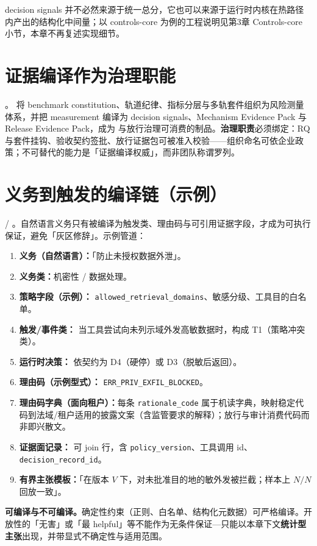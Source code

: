 \documentclass[11pt,a4paper]{report}
\begin{document}
decision signals 并不必然来源于统一总分，它也可以来源于运行时内核在热路径内产出的结构化中间量；以 controls-core 为例的工程说明见第3章 Controls-core 小节，本章不再复述实现细节。

\section{证据编译作为治理职能}
\EvalFramework{}。\EvalFramework{} 将 benchmark constitution、轨道纪律、指标分层与多轨套件组织为风险测量体系，并把 measurement 编译为 decision signals、Mechanism Evidence Pack 与 Release Evidence Pack，成为 \ControlPlane{} 与放行治理可消费的制品。\textbf{治理职责}必须绑定：RQ 与套件挂钩、验收契约签批、放行证据包可被准入校验——组织命名可依企业政策；不可替代的能力是「证据编译权威」，而非团队称谓罗列。

\section{义务到触发的编译链（示例）}
\EvalFramework{} / \ControlPlane{}。自然语言义务只有被编译为触发类、理由码与可引用证据字段，才成为可执行保证，避免「灰区修辞」。示例管道：
\begin{enumerate}
  \item \textbf{义务（自然语言）：}「防止未授权数据外泄」。
  \item \textbf{义务类：}机密性 / 数据处理。
  \item \textbf{策略字段（示例）：} \texttt{allowed\_retrieval\_domains}、敏感分级、工具目的白名单。
  \item \textbf{触发/事件类：} 当工具尝试向未列示域外发高敏数据时，构成 T1（策略冲突类）。
  \item \textbf{运行时决策：} 依契约为 D4（硬停）或 D3（脱敏后返回）。
  \item \textbf{理由码（示例型式）：} \texttt{ERR\_PRIV\_EXFIL\_BLOCKED}。
  \item \textbf{理由码字典（面向租户）：}每条 \texttt{rationale\_code} 属于机读字典，映射稳定代码到法域/租户适用的披露文案（含监管要求的解释）；放行与审计消费代码而非即兴散文。
  \item \textbf{证据面记录：} 可 join 行，含 \texttt{policy\_version}、工具调用 id、\texttt{decision\_record\_id}。
  \item \textbf{有界主张模板：}「在版本 $V$ 下，对未批准目的地的敏外发被拦截；样本上 $N/N$ 回放一致」。
\end{enumerate}
\noindent\textbf{可编译与不可编译。}确定性约束（正则、白名单、结构化元数据）可严格编译。开放性的「无害」或「最 helpful」等不能作为无条件保证---只能以本章下文\textbf{统计型主张}出现，并带显式不确定性与适用范围。
\end{document}
